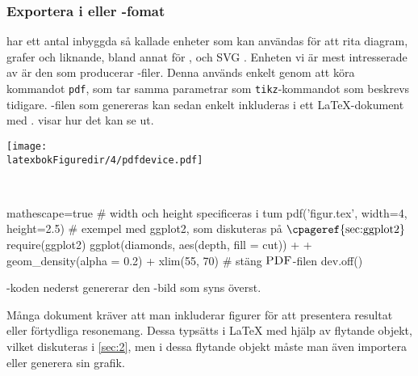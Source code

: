 \documentclass[lang=sv,ptsize=10pt,font=none,nomath,titles=bf,../../a4.tex]{subfiles}
\begin{document}

\subsubsection{Exportera i \PDF eller \PNG-fomat}

\Rlogo har ett antal inbyggda så kallade enheter  som kan
användas för att rita diagram, grafer och liknande, bland annat för \EPS,
\PNG och \textsc{SVG} \parencite[\ppno~675–676]{RCoreTeam12}. Enheten vi är mest
intresserade av är den som producerar \PDF-filer. Denna används enkelt
genom att köra kommandot \texttt{pdf}, som tar samma parametrar som
\texttt{tikz}-kommandot som beskrevs tidigare. \PDF-filen som genereras
kan sedan enkelt inkluderas i ett \LaTeX-dokument med .
 visar hur det kan se ut.

\begin{kod}[tbp]
	\centering
	\begin{minipage}{\textwidth}
		\centering
		\texttt{[image: \\latexbokFiguredir/4/pdfdevice.pdf]}
	\end{minipage}
	\\[1ex]
	\begin{minipage}{\textwidth}
		\begin{rcode*}{mathescape=true}
# width och height specificeras i tum
pdf('figur.tex', width=4, height=2.5)
# exempel med ggplot2, som diskuteras på $\text{\cpageref{sec:ggplot2}}$
require(ggplot2)
ggplot(diamonds, aes(depth, fill = cut)) +
  + geom_density(alpha = 0.2) + xlim(55, 70)
# stäng $\text{\textsc{PDF}}$-filen
dev.off()
		\end{rcode*}
	\end{minipage}
	\caption{\Rlogo-koden nederst genererar den \PDF-bild som
	syns överst.}
	\label{ex:pdfdevice}
\end{kod}


\iffalse
Många dokument kräver att man inkluderar figurer för att presentera
resultat eller förtydliga resonemang. Dessa typsätts i \LaTeX{} med hjälp
av flytande objekt, vilket diskuteras i \cref{sec:2}, men i dessa
flytande objekt måste man även importera eller generera sin grafik.
\end{document}
